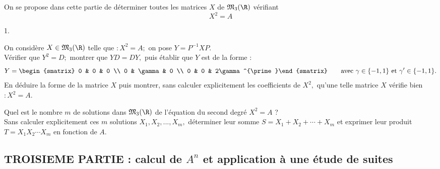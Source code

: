 \documentclass[11pt]{article}%
\begin{document}
On se propose dans cette partie de déterminer toutes les matrices $X$
de $\mathfrak{M}_{3}(\R)$ vérifiant 
\[
X^{2} = A
\]

\begin{noliste}{1.}
 \setlength{\itemsep}{4mm}
\item On considère $X\in \mathfrak{M}_{3}(\R)$ telle que $ :X^{2} = A;$
on pose $Y = P^{-1}XP.$\\
Vérifier que $Y^{2} = D;$ montrer que $YD = DY,$ puis établir que $Y$
est de la
forme : 
\[
Y = 
\begin{smatrix}
0 & 0 & 0 \\
0 & \gamma & 0 \\
0 & 0 & 2\gamma ^{\prime }\end{smatrix}
\qquad \text{avec }\gamma \in \{-1,1\}\text{ et }\gamma ^{\prime }\in
\{-1,1\}.
\]
En déduire la forme de la matrice $X$ puis montrer, sans calculer
explicitement les coefficients de $X^{2},$ qu'une telle matrice $X$
vérifie
bien $ :X^{2} = A.$

\item Quel est le nombre $m$ de solutions dans $\mathfrak{M}_{3}(\R) 
$ de l'équation du second degré $X^{2} = A$ ?\\
Sans calculer explicitement ces $m$ solutions $X_{1},X_{2},...,X_{m},$
déterminer leur somme $S = X_{1} + X_{2} + \cdots + X_{m}$ et exprimer
leur produit $T = X_{1}X_{2}\cdots X_{m}$ en fonction de $A.$
\end{noliste}

\subsection*{TROISIEME PARTIE : calcul de $A^{n}$ et application à une
étude
de suites}
\end{document}
